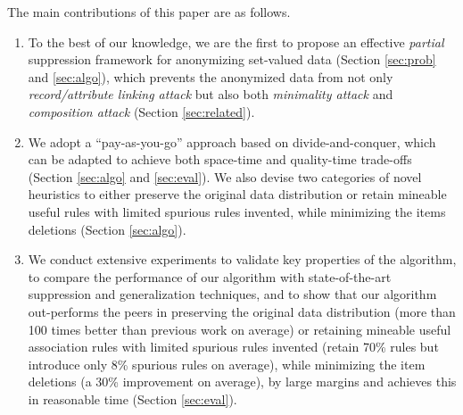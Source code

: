 
The main contributions of this paper are as follows.
\begin{enumerate}
\item To the best of our knowledge, we are the first to propose an
    effective \emph{partial} suppression framework for anonymizing
    set-valued data (Section \ref{sec:prob} and
    \ref{sec:algo}), which %
    prevents
    the anonymized data from not only {\em record/attribute linking
    attack} \cite{FungWCY10:Survey} but also both {\em minimality
    attack} \cite{Wong:2007:Minimality} and {\em composition attack}
    \cite{Ganta:2008:Composition} (Section \ref{sec:related}).
\item We adopt a ``pay-as-you-go'' approach based on divide-and-conquer,
    which can be adapted to achieve both space-time and quality-time
    trade-offs (Section \ref{sec:algo} and \ref{sec:eval}). We also devise two
    categories of novel heuristics to either preserve the original data
    distribution or retain mineable useful rules with limited spurious
    rules invented, while minimizing the items deletions (Section
    \ref{sec:algo}).
\item We conduct extensive experiments to validate key properties of the
    algorithm, to compare the performance of our algorithm with
    state-of-the-art suppression and generalization techniques, and to
    show that our algorithm out-performs the peers in preserving the
    original data distribution (more than 100 times better
    than previous work on average)
    or retaining mineable useful association
    rules with limited spurious rules invented (retain 70\% rules
    but introduce only 8\% spurious rules on average),
     while minimizing the item
    deletions (a 30\% improvement on average), by large margins and
    achieves this in reasonable time (Section \ref{sec:eval}).
\end{enumerate}

